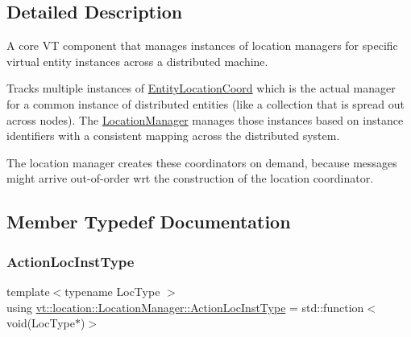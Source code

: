 \subsection{Detailed Description}
A core VT component that manages instances of location managers for specific virtual entity instances across a distributed machine. 

Tracks multiple instances of {\ttfamily \hyperlink{structvt_1_1location_1_1_entity_location_coord}{Entity\+Location\+Coord}} which is the actual manager for a common instance of distributed entities (like a collection that is spread out across nodes). The {\ttfamily \hyperlink{structvt_1_1location_1_1_location_manager}{Location\+Manager}} manages those instances based on instance identifiers with a consistent mapping across the distributed system.

The location manager creates these coordinators on demand, because messages might arrive out-\/of-\/order wrt the construction of the location coordinator. 

\subsection{Member Typedef Documentation}
\mbox{\label{structvt_1_1location_1_1_location_manager_a6de3841092c537efc5fb8376128bfe18}} 
\subsubsection{\texorpdfstring{Action\+Loc\+Inst\+Type}{ActionLocInstType}}
{\footnotesize\ttfamily template$<$typename Loc\+Type $>$ \\
using \hyperlink{structvt_1_1location_1_1_location_manager_a6de3841092c537efc5fb8376128bfe18}{vt\+::location\+::\+Location\+Manager\+::\+Action\+Loc\+Inst\+Type} =  std\+::function$<$void(Loc\+Type$\ast$)$>$}

\mbox{\label{structvt_1_1location_1_1_location_manager_a03472723aecf57cd99cd221ef2164edb}} 
